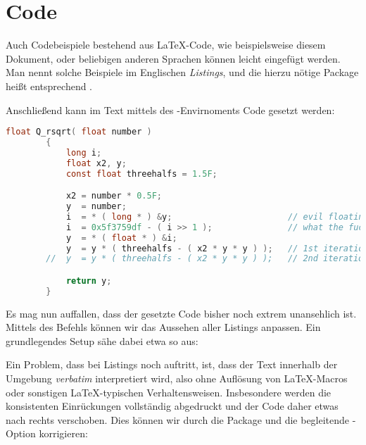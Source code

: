 \section{Code}
Auch Codebeispiele bestehend aus \LaTeX{}-Code, wie beispielsweise diesem Dokument, oder beliebigen anderen Sprachen können leicht eingefügt werden.
Man nennt solche Beispiele im Englischen \emph{Listings}, und die hierzu nötige Package heißt entsprechend .
\begin{latexlisting}
	\usepackage{listings}
\end{latexlisting}
Anschließend kann im Text mittels des -Envirnoments Code gesetzt werden:
\begin{latexlisting}
	\begin{lstlisting}[language=C]
		float Q_rsqrt( float number )
		{
			long i;
			float x2, y;
			const float threehalfs = 1.5F;

			x2 = number * 0.5F;
			y  = number;
			i  = * ( long * ) &y;                       // evil floating point bit level hacking
			i  = 0x5f3759df - ( i >> 1 );               // what the fuck?
			y  = * ( float * ) &i;
			y  = y * ( threehalfs - ( x2 * y * y ) );   // 1st iteration
		//	y  = y * ( threehalfs - ( x2 * y * y ) );   // 2nd iteration, this can be removed

			return y;
		}
	\end{lstlisting}
\end{latexlisting}
Es mag nun auffallen, dass der gesetzte Code bisher noch extrem unansehlich ist.
Mittels des Befehls  können wir das Aussehen aller Listings anpassen.
Ein grundlegendes Setup sähe dabei etwa so aus:
\begin{latexlisting}
	\lstset{
	    basicstyle=\ttfamily\footnotesize,
		columns=fullflexible,
	    breakatwhitespace=false,         
	    breaklines=true,                 
	    keepspaces=true,                 
	    numbers=none,       
	    numbersep=5pt,                  
	    showspaces=false,                
	    showstringspaces=false,
	    showtabs=false,                  
	    tabsize=4,
	}
\end{latexlisting}
Ein Problem, dass bei Listings noch auftritt, ist, dass der Text innerhalb der Umgebung \emph{verbatim} interpretiert wird, also ohne Auflösung von \LaTeX{}-Macros oder sonstigen \LaTeX{}-typischen Verhaltensweisen.
Insbesondere werden die konsistenten Einrückungen vollständig abgedruckt und der Code daher etwas nach rechts verschoben.
Dies können wir durch die Package  und die begleitende -Option  korrigieren:
